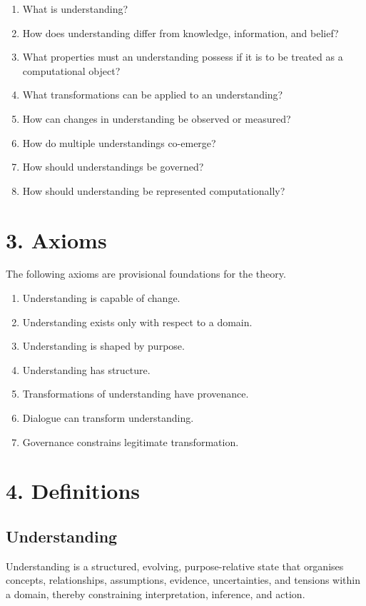 \begin{enumerate}
\item What is understanding?
\item How does understanding differ from knowledge, information, and belief?
\item What properties must an understanding possess if it is to be treated as a computational object?
\item What transformations can be applied to an understanding?
\item How can changes in understanding be observed or measured?
\item How do multiple understandings co-emerge?
\item How should understandings be governed?
\item How should understanding be represented computationally?
\end{enumerate}

\section*{3. Axioms}

The following axioms are provisional foundations for the theory.

\begin{enumerate}
\item Understanding is capable of change.
\item Understanding exists only with respect to a domain.
\item Understanding is shaped by purpose.
\item Understanding has structure.
\item Transformations of understanding have provenance.
\item Dialogue can transform understanding.
\item Governance constrains legitimate transformation.
\end{enumerate}

\section*{4. Definitions}

\subsection*{Understanding}

Understanding is a structured, evolving, purpose-relative state that organises concepts, relationships, assumptions, evidence, uncertainties, and tensions within a domain, thereby constraining interpretation, inference, and action.


